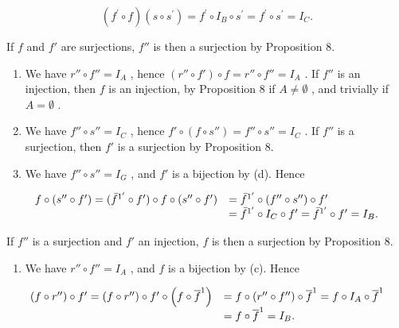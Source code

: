\[
(f ^ {\prime} \circ f) (s \circ s ^ {\prime}) = f ^ {\prime} \circ I _ {B} \circ s ^ {\prime} = f ^ {\prime} \circ s ^ {\prime} = I _ {C}.
\]

If \(f\) and \(f'\) are surjections, \(f''\) is then a surjection by Proposition 8.

\begin{enumerate}
\def\labelenumi{(\alph{enumi})}
\setcounter{enumi}{2}
\item
  We have \(r'' \circ f'' = I_A\) , hence \((r'' \circ f') \circ f = r'' \circ f'' = I_A\) . If \(f''\) is an injection, then \(f\) is an injection, by Proposition 8 if \(A \neq \emptyset\) , and trivially if \(A = \emptyset\) .
\item
  We have \(f'' \circ s'' = I_C\) , hence \(f' \circ (f \circ s'') = f'' \circ s'' = I_C\) . If \(f''\) is a surjection, then \(f'\) is a surjection by Proposition 8.
\item
  We have \(f'' \circ s'' = I_G\) , and \(f'\) is a bijection by (d). Hence
\end{enumerate}

\[
\begin{array}{r l} f \circ (s ^ {\prime \prime} \circ f ^ {\prime}) = (\bar {f} ^ {1 ^ {\prime}} \circ f ^ {\prime}) \circ f \circ (s ^ {\prime \prime} \circ f ^ {\prime}) & = \bar {f} ^ {1 ^ {\prime}} \circ (f ^ {\prime \prime} \circ s ^ {\prime \prime}) \circ f ^ {\prime} \\ & = \bar {f} ^ {1 ^ {\prime}} \circ I _ {C} \circ f ^ {\prime} = \bar {f} ^ {1 ^ {\prime}} \circ f ^ {\prime} = I _ {B}. \end{array}
\]

If \(f''\) is a surjection and \(f'\) an injection, \(f\) is then a surjection by Proposition 8.

\begin{enumerate}
\def\labelenumi{(\alph{enumi})}
\setcounter{enumi}{5}
\tightlist
\item
  We have \(r'' \circ f'' = I_A\) , and \(f\) is a bijection by (c). Hence
\end{enumerate}

\[
\begin{array}{r l} \left(f \circ r ^ {\prime \prime}\right) \circ f ^ {\prime} = \left(f \circ r ^ {\prime \prime}\right) \circ f ^ {\prime} \circ \left(f \circ \overline {{f}} ^ {1}\right) & = f \circ \left(r ^ {\prime \prime} \circ f ^ {\prime \prime}\right) \circ \overline {{f}} ^ {1} = f \circ I _ {A} \circ \overline {{f}} ^ {1} \\ & = f \circ \overline {{f}} ^ {1} = I _ {B}. \end{array}
\]

